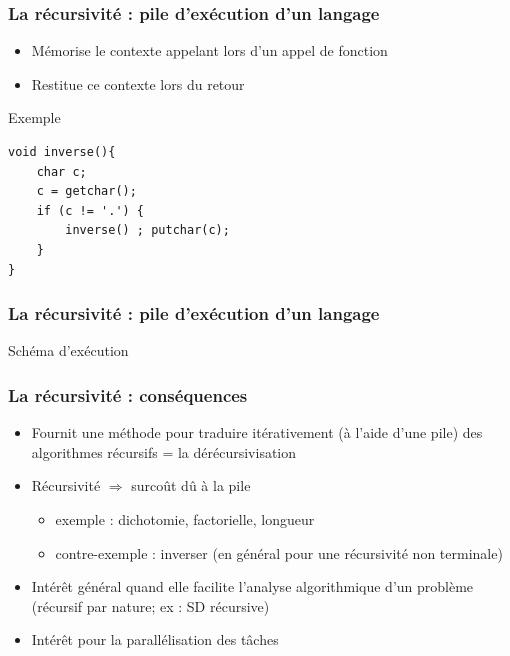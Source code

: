 \documentclass[table,handout,tikz,12pt,svgnames]{beamer}
\begin{document}
\begin{frame}[fragile=singleslide]
	\frametitle{La récursivité : pile d'exécution d'un langage}
	\vspace{-0.2cm}
	\begin{block}{}
		\begin{itemize}
			\item Mémorise le contexte appelant lors d'un appel de fonction
			\item Restitue ce contexte lors du retour
		\end{itemize}
	\end{block}
	\begin{block}{Exemple} %
		\begin{verbatim}
void inverse(){
	char c;
	c = getchar();
	if (c != '.') {
		inverse() ; putchar(c);
	}
}
		\end{verbatim}
	\end{block}
\end{frame}

\begin{frame}[fragile=singleslide]
	\frametitle{La récursivité : pile d'exécution d'un langage}
	\vspace{-4cm}
	\begin{block}{Schéma d'exécution}
	\end{block}
\end{frame}

\begin{frame}[fragile=singleslide]
	\frametitle{La récursivité : conséquences}
	\vspace{-0.2cm}
	\begin{block}{}
		\begin{itemize}
			\item Fournit une méthode pour traduire itérativement (à l'aide d'une pile) des 
			algorithmes récursifs = la dérécursivisation
			\item Récursivité $\Rightarrow$ surcoût dû à la pile
			\begin{itemize}
				\item exemple : dichotomie, factorielle, longueur
				\item contre-­exemple : inverser (en général pour une récursivité non terminale)
			\end{itemize}
			\item Intérêt général quand elle facilite l'analyse algorithmique d'un problème (récursif par nature; ex : SD récursive)
			\item Intérêt pour la parallélisation des tâches
		\end{itemize}
	\end{block}
\end{frame}
\end{document}
